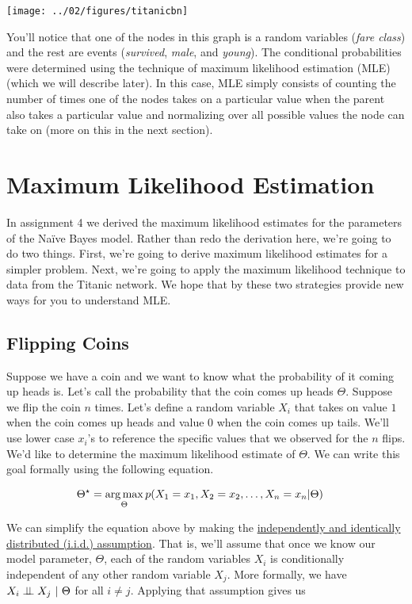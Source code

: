 \documentclass{tufte-handout}
\begin{document}
\begin{center}
\texttt{[image: ../02/figures/titanicbn]}
\end{center}

You'll notice that one of the nodes in this graph is a random variables (\emph{fare class}) and the rest are events (\emph{survived}, \emph{male}, and \emph{young}).  The conditional probabilities were determined using the technique of maximum likelihood estimation (MLE) (which we will describe later).  In this case, MLE simply consists of counting the number of times one of the nodes takes on a particular value when the parent also takes a particular value and normalizing over all possible values the node can take on (more on this in the next section).

\section{Maximum Likelihood Estimation}

In assignment 4 we derived the maximum likelihood estimates for the parameters of the Na\"ive Bayes model.  Rather than redo the derivation here, we're going to do two things.  First, we're going to derive maximum likelihood estimates for a simpler problem.  Next, we're going to apply the maximum likelihood technique to data from the Titanic network.  We hope that by these two strategies provide new ways for you to understand MLE.

\subsection{Flipping Coins}

Suppose we have a coin and we want to know what the probability of it coming up heads is.  Let's call the probability that the coin comes up heads $\Theta$.  Suppose we flip the coin $n$ times.  Let's define a random variable $X_i$ that takes on value $1$ when the coin comes up heads and value $0$ when the coin comes up tails.  We'll use lower case $x_i$'s to reference the specific values that we observed for the $n$ flips.  We'd like to determine the maximum likelihood estimate of $\Theta$.  We can write this goal formally using the following equation.


\begin{align}
\Theta^\star &= \operatorname*{arg\,max}_{\Theta} p(X_1 = x_1, X_2 = x_2, \ldots, X_n = x_n | \Theta)
\end{align} 

We can simplify the equation above by making the \href{https://en.wikipedia.org/wiki/Independent_and_identically_distributed_random_variables}{independently and identically distributed (i.i.d.) assumption}.  That is, we'll assume that once we know our model parameter, $\Theta$, each of the random variables $X_i$ is conditionally independent of any other random variable $X_j$.  More formally, we have $X_i \perp\!\!\!\perp X_j~|~\Theta$ for all $i \neq j$.  Applying that assumption gives us
\end{document}
